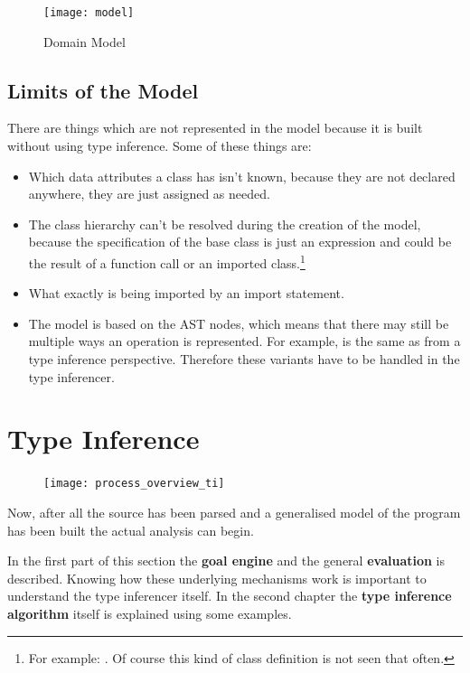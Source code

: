 \documentclass[12pt,halfparskip,DIV11,BCOR10mm]{scrreprt}
\begin{document}
\begin{figure}[H]
    \centering
    \texttt{[image: model]}
    \caption{Domain Model}
    \label{fig:model}
\end{figure}

\section{Limits of the Model}

There are things which are not represented in the model because it is built without using type inference. Some of these things are:

\begin{itemize}
    \item Which data attributes a class has isn't known, because they are not declared anywhere, they are just assigned as needed.
    \item The class hierarchy can't be resolved during the creation of the model, because the specification of the base class is just an expression and could be the result of a function call or an imported class.\footnote{
    For example: . Of course this kind of class definition is not seen that often.}
    \item What exactly is being imported by an import statement.
    \item The model is based on the AST nodes, which means that there may still be multiple ways an operation is represented. For example,  is the same as  from a type inference perspective. Therefore these variants have to be handled in the type inferencer.
\end{itemize}


\chapter{Type Inference}

\begin{figure}
    \vspace{-0.6cm}
    \texttt{[image: process\_overview\_ti]}
\end{figure}

Now, after all the source has been parsed and a generalised model of the program has been built the actual analysis can begin. 

In the first part of this section the \textbf{goal engine} and the general \textbf{evaluation} is described. Knowing how these underlying mechanisms work is important to understand the type inferencer itself. In the second chapter the \textbf{type inference algorithm} itself is explained using some examples. 
\end{document}
